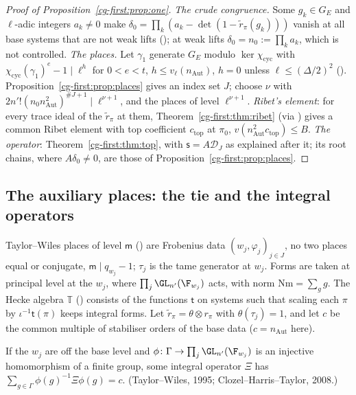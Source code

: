 \begin{proof}[Proof of Proposition~\ref{cg-first:prop:one}]
\emph{The crude congruence.} Some $g_k\in G_E$ and $\ell$-adic integers $a_k\neq0$ make
$\delta_0=\prod_k(a_k-\det(1-\tilde r_\pi(g_k)))$ vanish at all base systems that are not weak lifts
(); at weak lifts $\delta_0=n_0:=\prod_ka_k$, which
is not controlled.
\emph{The places.} Let $\gamma_1$ generate $G_E$ modulo $\ker\chi_{\mathrm{cyc}}$ with
$\chi_{\mathrm{cyc}}(\gamma_1)^e-1\mid\ell^h$ for $0<e<t$, $h\le v_\ell(n_{\mathrm{Aut}})$, $h=0$ unless
$\ell\le(\Delta/2)^2$ (). Proposition~\ref{cg-first:prop:places}
gives an index set $J$; choose $\nu$ with $2n'!(n_0n_{\mathrm{Aut}}^2)^{\#J+1}\mid\ell^{\nu+1}$, and the places
of level $\ell^{\nu+1}$. \emph{Ribet's element}: for every trace ideal of the $\tilde r_\pi$ at them,
Theorem~\ref{cg-first:thm:ribet} (via ) gives a
common Ribet element with top coefficient $c_{\mathrm{top}}$ at $\pi_0$, $v(n_{\mathrm{Aut}}^2c_{\mathrm{top}})\le B$.
\emph{The operator}: Theorem~\ref{cg-first:thm:top}, with $\mathsf s=A\mathcal D_J$ as explained after it; its
root chains, where $A\delta_0\neq0$, are those of Proposition~\ref{cg-first:prop:places}.
\end{proof}

\subsection{The auxiliary places: the tie and the integral operators}\label{cg-first:ss:aux}

Taylor--Wiles places of level $\mathsf m$ () are Frobenius data
$(w_j,\varphi_j)_{j\in J}$, no two places equal or conjugate, $\mathsf m\mid q_{w_j}-1$; $\tau_j$ is the tame
generator at $w_j$. Forms are taken at principal level at the $w_j$, where $\prod_j\GL_{n'}(\F_{w_j})$
acts, with norm $\mathrm{Nm}=\sum_gg$. The Hecke algebra $\mathbb T$
() consists of the functions $\mathsf t$ on systems such that scaling
each $\pi$ by $\iota^{-1}\mathsf t(\pi)$ keeps integral forms. Let $\tilde r_\pi=\theta\otimes r_\pi$ with $\theta(\tau_j)=1$, and let
$c$ be the common multiple of stabiliser orders of the base data ($c=n_{\mathrm{Aut}}$ here).

\begin{fact}
\label{cg-first:fact:tw}
If the $w_j$ are off the base level and $\phi\colon\Gamma\to\prod_j\GL_{n'}(\F_{w_j})$ is an injective
homomorphism of a finite group, some integral operator $\Xi$ has
$\sum_{g\in\Gamma}\phi(g)^{-1}\Xi\phi(g)=c$. (Taylor--Wiles, 1995; Clozel--Harris--Taylor, 2008.)
\end{fact}

